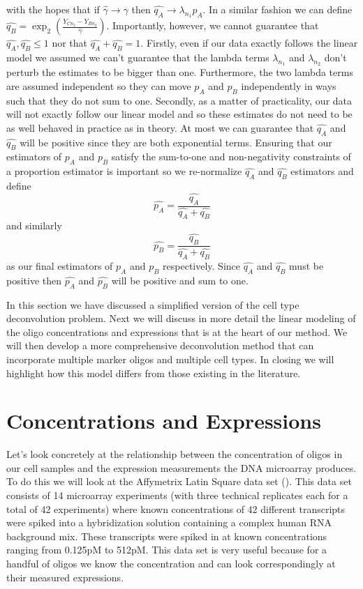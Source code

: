 \documentclass[reqno,12pt,oneside]{report}\usepackage[]{graphicx}\usepackage[]{color}
\theoremstyle{plain}
\theoremstyle{definition}
\theoremstyle{remark}
\numberwithin{theorem}{chapter}     %
\begin{document}
with the hopes that if $\widehat{\gamma}\rightarrow\gamma$ then $\widehat{q_A}\rightarrow \lambda_{n_1} p_A$. In a similar fashion we can define $\widehat{q_B} = \exp_2\left(\frac{Y_{Cn_2}-Y_{Bn_2}}{\widehat{\gamma}}\right)$. Importantly, however, we cannot guarantee that $\widehat{q_A},\widehat{q_B}\leq 1$ nor that $\widehat{q_A}+\widehat{q_B} = 1$. Firstly, even if our data exactly follows the linear model we assumed we can't guarantee that the lambda terms $\lambda_{n_1}$ and $\lambda_{n_2}$ don't perturb the estimates to be bigger than one. Furthermore, the two lambda terms are assumed independent so they can move $p_A$ and $p_B$ independently in ways such that they do not sum to one. Secondly, as a matter of practicality, our data will not exactly follow our linear model and so these estimates do not need to be as well behaved in practice as in theory. At most we can guarantee that $\widehat{q_A}$ and $\widehat{q_B}$ will be positive since they are both exponential terms. Ensuring that our estimators of $p_A$ and $p_B$ satisfy the sum-to-one and non-negativity constraints of a proportion estimator is important so we re-normalize $\widehat{q_A}$ and $\widehat{q_B}$ estimators and define
\[
\widehat{p_A} = \frac{\widehat{q_A}}{\widehat{q_A}+\widehat{q_B}}
\]
and similarly 
\[
\widehat{p_B} = \frac{\widehat{q_B}}{\widehat{q_A}+\widehat{q_B}}
\]
as our final estimators of $p_A$ and $p_B$ respectively. Since $\widehat{q_A}$ and $\widehat{q_B}$ must be positive then $\widehat{p_A}$ and $\widehat{p_B}$ will be positive and sum to one. 

In this section we have discussed a simplified version of the cell type deconvolution problem. Next we will discuss in more detail the linear modeling of the oligo concentrations and expressions that is at the heart of our method. We will then develop a more comprehensive deconvolution method that can incorporate multiple marker oligos and multiple cell types. In closing we will highlight how this model differs from those existing in the literature.

\section{Concentrations and Expressions}

Let's look concretely at the relationship between the concentration of oligos in our cell samples and the expression measurements the DNA microarray produces. To do this we will look at the Affymetrix Latin Square data set (\cite{latin}). This data set consists of 14 microarray experiments (with three technical replicates each for a total of 42 experiments) where known concentrations of 42 different transcripts were spiked into a hybridization solution containing a complex human RNA background mix. These transcripts were spiked in at known concentrations ranging from 0.125pM to 512pM. This data set is very useful because for a handful of oligos we know the concentration and can look correspondingly at their measured expressions.
\end{document}
